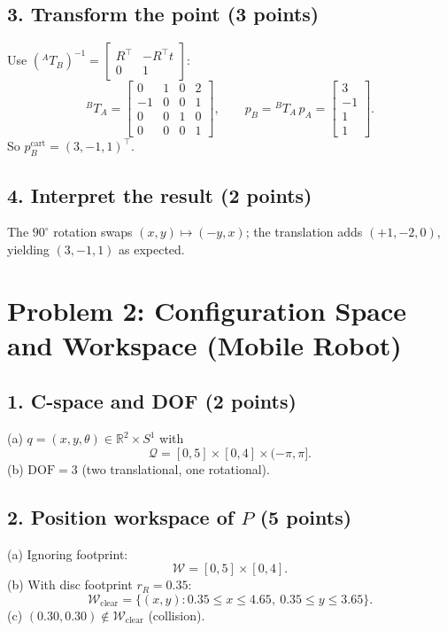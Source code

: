 \documentclass[11pt]{article}
\begin{document}
\subsection*{3. Transform the point (3 points)}
Use ${(^{A}\!T_{B})}^{-1}=\begin{bmatrix}R^\top&-R^\top t\\ 0&1\end{bmatrix}$:
\[
^{B}\!T_{A}=
\begin{bmatrix}
0 & 1 & 0 & 2\\
-1 & 0 & 0 & 1\\
0 & 0 & 1 & 0\\
0 & 0 & 0 & 1
\end{bmatrix},\qquad
p_B = {}^{B}\!T_{A}\,p_A =
\begin{bmatrix} 3\\ -1\\ 1\\ 1\end{bmatrix}.
\]
So $p_B^{\text{cart}}=(3,-1,1)^\top$.

\subsection*{4. Interpret the result (2 points)}
The $90^\circ$ rotation swaps $(x,y)\mapsto(-y,x)$; the translation adds $(+1,-2,0)$, yielding $(3,-1,1)$ as expected.

\section*{Problem 2: Configuration Space and Workspace (Mobile Robot)}

\subsection*{1. C-space and DOF (2 points)}
\noindent
(a) $q=(x,y,\theta)\in\mathbb{R}^2\times S^1$ with
\[
\mathcal{Q}=[0,5]\times[0,4]\times(-\pi,\pi].
\]
(b) $\mathrm{DOF}=3$ (two translational, one rotational).

\subsection*{2. Position workspace of $P$ (5 points)}
(a) Ignoring footprint:
\[
\mathcal{W}=[0,5]\times[0,4].
\]
(b) With disc footprint $r_R=0.35$:
\[
\mathcal{W}_{\text{clear}}=\{(x,y): 0.35\le x\le 4.65,\ 0.35\le y\le 3.65\}.
\]
(c) $(0.30,0.30)\notin\mathcal{W}_{\text{clear}}$ (collision).
\end{document}
